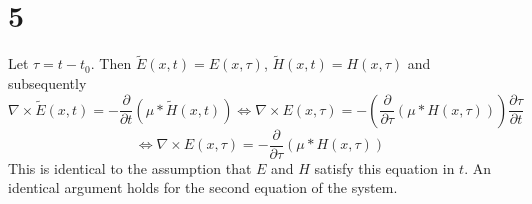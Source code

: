 \documentclass{article}
\begin{document}
\section{}


\section*{5}
Let $\tau = t-t_0$. Then $\tilde{E}(x,t)=E(x,\tau)$, $\tilde{H}(x,t)=H(x,\tau)$ and subsequently
\[\nabla \times \tilde{E}(x,t) = -\frac{\partial}{\partial t}(\mu*\tilde{H}(x,t)) \Leftrightarrow \nabla\times E(x,\tau)=-\left( \frac{\partial}{\partial\tau}(\mu*H(x,\tau))\right)\frac{\partial\tau}{\partial t}\]
\[\Leftrightarrow \nabla \times E(x,\tau)=-\frac{\partial}{\partial\tau}(\mu*H(x,\tau))\]
This is identical to the assumption that $E$ and $H$ satisfy this equation in $t$.
An identical argument holds for the second equation of the system.
\end{document}
